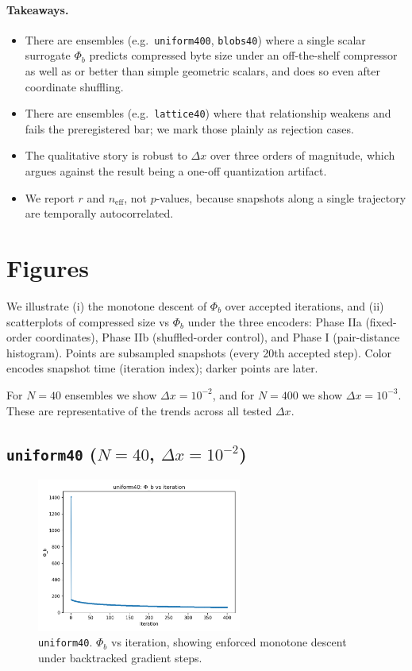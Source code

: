 \documentclass[11pt,a4paper]{article}
\numberwithin{equation}{section}
\newcommand{\phib}{\Phi_b}
\begin{document}
\paragraph{Takeaways.}
\begin{itemize}
\item There are ensembles (e.g.\ \texttt{uniform400}, \texttt{blobs40}) where a single scalar surrogate $\phib$ predicts compressed byte size under an off-the-shelf compressor as well as or better than simple geometric scalars, and does so even after coordinate shuffling.
\item There are ensembles (e.g.\ \texttt{lattice40}) where that relationship weakens and fails the preregistered bar; we mark those plainly as rejection cases.
\item The qualitative story is robust to $\Delta x$ over three orders of magnitude, which argues against the result being a one-off quantization artifact.
\item We report $r$ and $n_{\text{eff}}$, not $p$-values, because snapshots along a single trajectory are temporally autocorrelated.
\end{itemize}

\section{Figures}
We illustrate (i) the monotone descent of $\phib$ over accepted iterations, and (ii) scatterplots of compressed size vs $\phib$ under the three encoders: Phase IIa (fixed-order coordinates), Phase IIb (shuffled-order control), and Phase I (pair-distance histogram). Points are subsampled snapshots (every 20th accepted step). Color encodes snapshot time (iteration index); darker points are later.

For $N{=}40$ ensembles we show $\Delta x = 10^{-2}$, and for $N{=}400$ we show $\Delta x = 10^{-3}$. These are representative of the trends across all tested $\Delta x$.

\subsection{\texttt{uniform40} ($N{=}40$, $\Delta x = 10^{-2}$)}
\begin{figure}[h!]
\centering
\includegraphics[width=0.6\textwidth]{figures/uniform40_dx0.01_phib_vs_iter.png}
\caption{\texttt{uniform40}. $\phib$ vs iteration, showing enforced monotone descent under backtracked gradient steps.}
\label{fig:uniform40_iter}
\end{figure}
\end{document}
